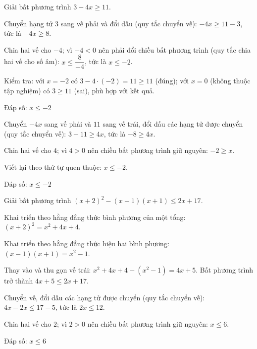 \begin{problem}[9DS-BPT-002]
Giải bất phương trình $3 - 4x \geq 11$.

\begin{solution}
Chuyển hạng tử $3$ sang vế phải và đổi dấu (quy tắc chuyển vế): $-4x \geq 11 - 3$, tức là $-4x \geq 8$.

Chia hai vế cho $-4$; vì $-4 < 0$ nên phải đổi chiều bất phương trình (quy tắc chia hai vế cho số âm): $x \leq \dfrac{8}{-4}$, tức là $x \leq -2$.

Kiểm tra: với $x = -2$ có $3 - 4 \cdot (-2) = 11 \geq 11$ (đúng); với $x = 0$ (không thuộc tập nghiệm) có $3 \geq 11$ (sai), phù hợp với kết quả.

Đáp số: $\boxed{x \leq -2}$
\end{solution}

\begin{solution}
Chuyển $-4x$ sang vế phải và $11$ sang vế trái, đổi dấu các hạng tử được chuyển (quy tắc chuyển vế): $3 - 11 \geq 4x$, tức là $-8 \geq 4x$.

Chia hai vế cho $4$; vì $4 > 0$ nên chiều bất phương trình giữ nguyên: $-2 \geq x$.

Viết lại theo thứ tự quen thuộc: $x \leq -2$.

Đáp số: $\boxed{x \leq -2}$
\end{solution}
\end{problem}

\begin{problem}[9DS-BPT-003]
Giải bất phương trình $(x + 2)^2 - (x - 1)(x + 1) \leq 2x + 17$.

\begin{solution}
Khai triển theo hằng đẳng thức bình phương của một tổng: $(x + 2)^2 = x^2 + 4x + 4$.

Khai triển theo hằng đẳng thức hiệu hai bình phương: $(x - 1)(x + 1) = x^2 - 1$.

Thay vào và thu gọn vế trái: $x^2 + 4x + 4 - (x^2 - 1) = 4x + 5$. Bất phương trình trở thành $4x + 5 \leq 2x + 17$.

Chuyển vế, đổi dấu các hạng tử được chuyển (quy tắc chuyển vế): $4x - 2x \leq 17 - 5$, tức là $2x \leq 12$.

Chia hai vế cho $2$; vì $2 > 0$ nên chiều bất phương trình giữ nguyên: $x \leq 6$.

Đáp số: $\boxed{x \leq 6}$
\end{solution}
\end{problem}

